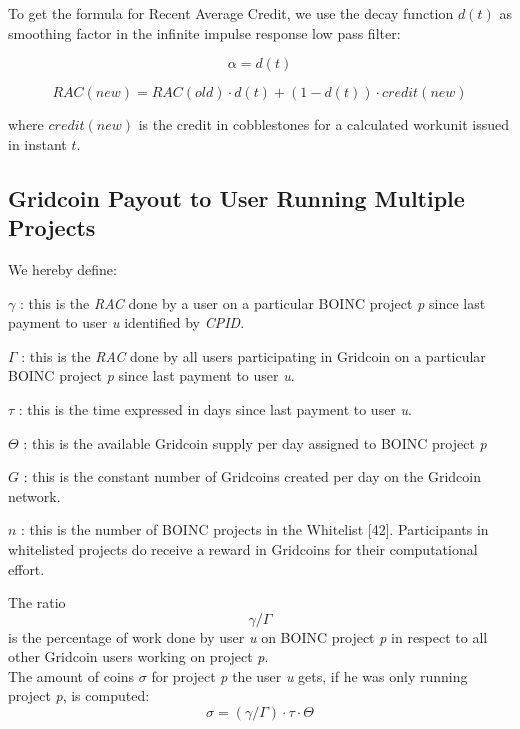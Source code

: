 To get the formula for Recent Average Credit, we use the decay function $d(t)$ as smoothing factor in the infinite impulse response low pass filter:

\begin{equation}
\alpha=d(t)
\end{equation}

\begin{equation}
RAC(new) = RAC(old) \cdot d(t) + (1-d(t)) \cdot credit(new)
\end{equation}

where $credit(new)$ is the credit in cobblestones for a calculated workunit issued in instant $t$.

\subsection{Gridcoin Payout to User Running Multiple Projects}

We hereby define:
\begin{description}
  \item{$\gamma$} : this is the \textit{RAC} done by a user on a particular BOINC project \textit{p} since last payment to user \textit{u} identified by \textit{CPID}.
  \item{$\Gamma$} : this is the \textit{RAC} done by all users participating in Gridcoin on a particular BOINC project \textit{p} since last payment to user \textit{u}.
  \item{$\tau$} : this is the time expressed in days since last payment to user \textit{u}.
  \item{$\Theta$} : this is the available Gridcoin supply per day assigned to BOINC project \textit{p}
  \item{$G$} : this is the constant number of Gridcoins created per day on the Gridcoin network. 
  \item{$n$} : this is the number of BOINC projects in the Whitelist [42]. Participants in whitelisted projects do receive a reward in Gridcoins for their computational effort.  
\end{description}

The ratio
\[\gamma/\Gamma\]
is the percentage of work done by user \textit{u} on BOINC project \textit{p} in respect to all other Gridcoin users working on project \textit{p}.\\

The amount of coins $\sigma$ for project \textit{p} the user \textit{u} gets, if he was only running project \textit{p}, is computed:
\[ \sigma = (\gamma / \Gamma) \cdot \tau \cdot \Theta \]

